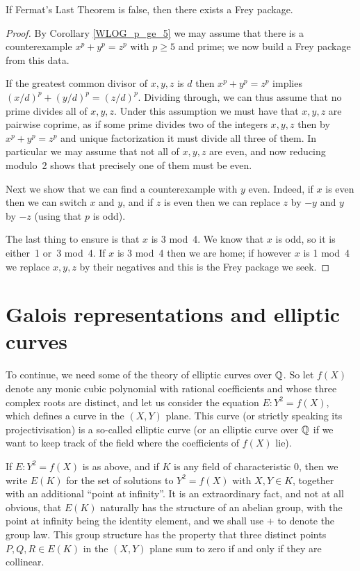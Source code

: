 \begin{lemma}\label{Frey_package_of_FLT_counterex}\leanok
  If Fermat's Last Theorem is false, then there exists a Frey package.
\end{lemma}
\begin{proof} By Corollary \ref{WLOG_p_ge_5} we may assume that there is a counterexample $x^p+y^p=z^p$ with $p\geq 5$ and prime; we now build a Frey package from this data.
  
  If the greatest common divisor of $x,y,z$ is $d$ then $x^p+y^p=z^p$ implies $(x/d)^p+(y/d)^p=(z/d)^p$. Dividing through, we can thus assume that no prime divides all of $x,y,z$. Under this assumption we must have that $x,y,z$ are pairwise coprime, as if some prime divides two of the integers $x,y,z$ then by $x^p+y^p=z^p$ and unique factorization it must divide all three of them. In particular we may assume that not all of $x,y,z$ are even, and now reducing modulo~2 shows that precisely one of them must be even. 
  
  Next we show that we can find a counterexample with $y$ even. Indeed, if $x$ is even then we can switch $x$ and $y$, and if $z$ is even then we can replace $z$ by $-y$ and $y$ by $-z$ (using that $p$ is odd).

  The last thing to ensure is that $x$ is 3 mod~4. We know that $x$ is odd, so it is either~1 or~3 mod~4. If $x$ is 3 mod~4 then we are home; if however $x$ is 1 mod~4 we replace $x,y,z$ by their negatives and this is the Frey package we seek.
\end{proof}

\section{Galois representations and elliptic curves}

To continue, we need some of the theory of elliptic curves over $\mathbb{Q}$. So let $f(X)$ denote any monic cubic polynomial with rational coefficients and whose three complex roots are distinct, and let us consider the equation $E:Y^2=f(X)$, which defines a curve in the $(X,Y)$ plane. This curve (or strictly speaking its projectivisation) is a so-called elliptic curve (or an elliptic curve over $\mathbb{Q}$ if we want to keep track of the field where the coefficients of $f(X)$ lie). 

If $E:Y^2=f(X)$ is as above, and if $K$ is any field of characteristic 0, then we write $E(K)$ for the set of solutions to $Y^2=f(X)$ with $X,Y\in K$, together with an additional ``point at infinity''. It is an extraordinary fact, and not at all obvious, that $E(K)$ naturally has the structure of an abelian group, with the point at infinity being the identity element, and we shall use $+$ to denote the group law. This group structure has the property that three distinct points $P,Q,R\in E(K)$ in the $(X,Y)$ plane sum to zero if and only if they are collinear.

